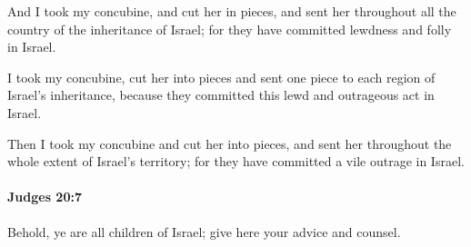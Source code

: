 			\begin{versebox}
					\item[BHS] 
					\item[ASV] And I took my concubine, and cut her in pieces, and sent her throughout all the country of the inheritance of Israel; for they have committed lewdness and folly in Israel.
					\item[NIV] I took my concubine, cut her into pieces and sent one piece to each region of Israel’s inheritance, because they committed this lewd and outrageous act in Israel.
					\item[NRSV] Then I took my concubine and cut her into pieces, and sent her throughout the whole extent of Israel’s territory; for they have committed a vile outrage in Israel.
			\end{versebox}

		\paragraph{Judges 20:7} %
			\label{JUDGES-20-7}

			Behold, ye are all children of Israel; give here your advice and counsel.

